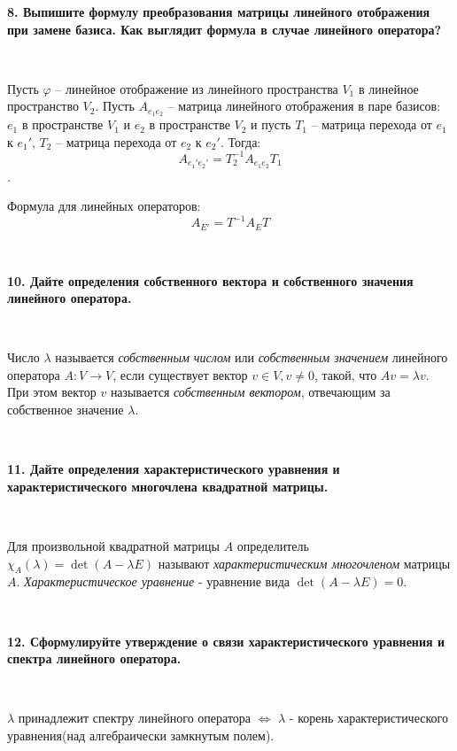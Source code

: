 \documentclass{article}
\begin{document}
    \textbf{8. Выпишите формулу преобразования матрицы линейного отображения при замене базиса. Как выглядит формула в случае линейного оператора?}

    {
        $\;$
        \setlength{\parindent}{0.4cm}
        \hangindent=0.4cm

    Пусть $\varphi$ -- линейное отображение из линейного пространства $V_1$ в линейное пространство $V_2$. Пусть $A_{e_1e_2}$ -- матрица линейного отображения в паре базисов: $e_1$  в пространстве $V_1$ и $e_2$ в пространстве $V_2$ и пусть $T_1$ -- матрица перехода от $e_1$ к $e_1'$, $T_2$ -- матрица перехода от $e_2$ к $e_2'$. Тогда: $$A_{e_1'e_2'}=T_2^{-1}A_{e_1e_2}T_1$$.

    Формула для линейных операторов: $$A_{E'}=T^{-1}A_ET$$

        $\;$
        \setlength{\parindent}{0cm}
        \hangindent=0cm
    }


    \textbf{10. Дайте определения собственного вектора и собственного значения линейного оператора.}

    $\;$
        {
        \setlength{\parindent}{0.4cm}
        \hangindent=0.4cm

        Число $\lambda$ называется \textit{собственным числом} или \textit{собственным значением} линейного оператора $A:V\rightarrow V$, если существует вектор $v\in V, v \not = 0$, такой, что $Av=\lambda v$. При этом вектор $v$ называется \textit{собственным вектором}, отвечающим за собственное значение $\lambda$.

        $\;$
        \setlength{\parindent}{0cm}
        \hangindent=0cm
    }

    \textbf{11. Дайте определения характеристического уравнения и характеристического многочлена квадратной матрицы.}

    $\;$
        {
        \setlength{\parindent}{0.4cm}
        \hangindent=0.4cm

        Для произвольной квадратной матрицы $A$ определитель $\chi_A(\lambda) = \det(A-\lambda E)$ называют \textit{характеристическим многочленом} матрицы $A$. \textit{Характеристическое уравнение} - уравнение вида $\det(A-\lambda E) = 0.$

        $\;$
        \setlength{\parindent}{0cm}
        \hangindent=0cm
    }

    \textbf{12. Сформулируйте утверждение о связи характеристического уравнения и спектра линейного оператора.}

    $\;$
        {
        \setlength{\parindent}{0.4cm}
        \hangindent=0.4cm

        $\lambda$ принадлежит спектру линейного оператора $\Leftrightarrow$ $\lambda$ - корень характеристического уравнения(над алгебраически замкнутым полем).

        $\;$
        \setlength{\parindent}{0cm}
        \hangindent=0cm
    }
\end{document}

